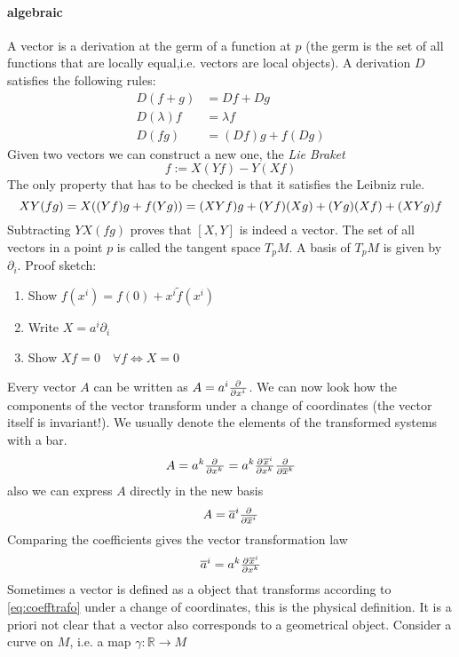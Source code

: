 \paragraph{algebraic}
A vector is a derivation at the germ of a function at $p$ (the germ is the set of all functions that are locally equal,i.e. vectors are local objects). A derivation $D$ satisfies the following rules:
\begin{align*}
D(f+g) &=Df+Dg\\
D(\lambda)f&=\lambda f\\
D(fg)&= (Df)g+f(Dg)
\end{align*}
Given two vectors we can construct a new one, the \emph{Lie Braket}
\begin{equation}
    [X,Y]f:=X(Yf)-Y(Xf)
\end{equation}
The only property that has to be checked is that it satisfies the Leibniz rule.
\begin{equation*}
XY(fg)=X((Yf)g+f(Yg))=(XYf)g+(Yf)(Xg)+(Yg)(Xf)+(XYg)f\\
\end{equation*}
Subtracting $YX(fg)$ proves that $[X,Y]$ is indeed a vector.
The set of all vectors in a point $p$ is called the tangent space $T_pM$. A basis of $T_pM$ is given by $\partial_i$.
Proof sketch:
\begin{enumerate}
    \item Show $f(x^i)=f(0)+x^i\tilde{f}(x^i)$
    \item Write $X=a^i\partial_i$
    \item Show $Xf=0\quad \forall f \iff X=0$
\end{enumerate}
Every vector $A$ can be written as $A=a^i\pd{}{{x^i}}$. We can now look how the components of the vector transform under a change of coordinates (the vector itself is invariant!). We usually denote the elements of the transformed systems with a bar.
\begin{equation}
    A= a^k\pd{}{{x^k}}= a^k\pd{\overline{x}^i}{{x^k}}\pd{}{{\overline{x}^k}}
\end{equation}
also we can express $A$ directly in the new basis
\begin{equation}
    A= \overline{a}^i\pd{}{{\overline{x}^i}}
\end{equation}
Comparing the coefficients gives the vector transformation law
\begin{equation}
    \overline{a}^i=a^k\pd{\overline{x}^i}{{x^k}}\label{eq:coefftrafo}
\end{equation}
Sometimes a vector is defined as a object that transforms according to \ref{eq:coefftrafo} under a change of coordinates, this is the physical definition. It is a priori not clear that a vector also corresponds to a geometrical object. Consider a curve on $M$, i.e. a map $\gamma:\mathbb{R}\to M$
